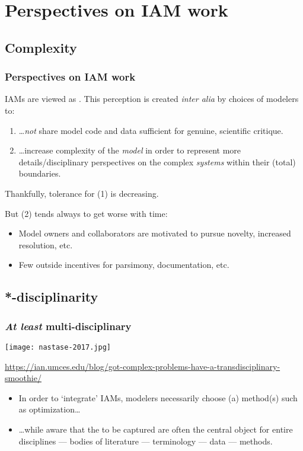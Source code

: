 \documentclass[12pt,aspectratio=169]{beamer}
\begin{document}
\section{Perspectives on IAM work}

\begin{frame}
\tableofcontentscurrent
\end{frame}

\subsection{Complexity}

\begin{frame}
\frametitle{Perspectives on IAM work}

IAMs are viewed as .
This perception is created \emph{inter alia} by choices of modelers to:

\medskip
\begin{enumerate}
  \item …\emph{not} share model code and data sufficient for genuine, scientific critique.
  \item …increase complexity of the \emph{model} in order to represent more details/disciplinary perspectives on the complex \emph{systems} within their (total) boundaries.
\end{enumerate}

\bigskip
Thankfully, tolerance for (1) is decreasing.

\medskip
But (2) tends always to get worse with time:
\begin{itemize}
  \item Model owners and collaborators are motivated to pursue novelty, increased resolution, etc.
  \item Few outside incentives for parsimony, documentation, etc.
\end{itemize}
\end{frame}

\subsection{*-disciplinarity}

\begin{frame}
\frametitle{\emph{At least} multi-disciplinary}

\texttt{[image: nastase-2017.jpg]}

{\scriptsize \url{https://ian.umces.edu/blog/got-complex-problems-have-a-transdisciplinary-smoothie/}}

\begin{itemize}
  \item In order to ‘integrate’ IAMs, modelers necessarily choose (a) method(s) such as optimization…
  \item …while aware that the  to be captured are often the central object for entire disciplines — bodies of literature — terminology — data — methods.
\end{itemize}

\end{frame}
\end{document}
